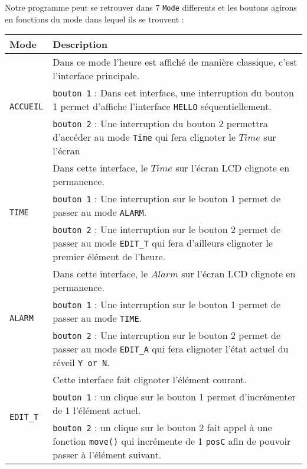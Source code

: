 \documentclass{article}
\begin{document}
		Notre programme peut se retrouver dans 7 \texttt{Mode} differents et les boutons agirons en fonctions du mode dans lequel ils se trouvent  :\\
		
		\begin{tabular}{|p{2cm}|p{13cm}|}
		\hline
		\textbf{Mode} & \textbf{Description}\\
		\hline
		\multirow{3}{*}{\texttt{ACCUEIL}} & Dans ce mode l'heure est affiché de manière classique, c'est l'interface principale.\\
		                         &\texttt{bouton 1} : Dans cet interface, une interruption du bouton 1 permet d'affiche l'interface \texttt{HELLO} séquentiellement.\\
		                         &\texttt{bouton 2} : Une interruption du bouton 2 permettra d'accéder au mode \texttt{Time} qui fera clignoter le $Time$ sur l'écran\\ 
		\hline
		\multirow{3}{*}{\texttt{TIME}} & Dans cette interface, le $Time$ sur l'écran LCD clignote en permanence.\\
		                                              & \texttt{bouton 1} : Une interruption sur le bouton 1 permet de passer au mode \texttt{ALARM}.\\ 
		                                              &\texttt{bouton 2} : Une interruption sur le bouton 2 permet de passer au mode \texttt{EDIT\_T} qui fera d'ailleurs clignoter le premier élément de l'heure.\\ 
		\hline
		\multirow{3}{*}{\texttt{ALARM}} & Dans cette interface, le $Alarm$ sur l'écran LCD clignote en permanence.\\
													    & \texttt{bouton 1} : Une interruption sur le bouton 1 permet de passer au mode \texttt{TIME}.\\ 
													    & \texttt{bouton 2} : Une interruption sur le bouton 2 permet de passer au mode \texttt{EDIT\_A} qui fera clignoter l'état actuel du réveil \texttt{Y or N}.\\ 
		\hline
		\multirow{3}{*}{\texttt{EDIT\_T}} & Cette interface fait clignoter l'élément courant.\\
														& \texttt{bouton 1} : un clique sur le bouton 1 permet d'incrémenter de 1 l'élément actuel.\\ 
														& \texttt{bouton 2} : un clique sur le bouton 2 fait appel à une fonction \texttt{move()} qui incrémente de 1 \texttt{posC} afin de pouvoir passer à l'élément suivant.\\    

\end{tabular}
\end{document}
